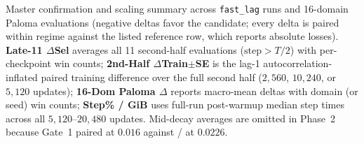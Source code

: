 \begin{table}[t]
\centering
\caption{Master confirmation and scaling summary across \confTotalRuns{}
\texttt{fast\_lag} runs and \confPalomaCount{} 16-domain Paloma evaluations
(negative deltas favor the candidate; every delta is paired within regime
against the listed  reference row, which reports absolute losses).
\textbf{Late-11 $\Delta$Sel} averages all 11 second-half evaluations
($\text{step} > T/2$) with per-checkpoint win counts; \textbf{2nd-Half
$\Delta$Train$\pm$SE} is the lag-1 autocorrelation-inflated paired training
difference over the full second half ($2{,}560$, $10{,}240$, or $5{,}120$
updates); \textbf{16-Dom Paloma $\Delta$} reports macro-mean deltas with domain
(or seed) win counts; \textbf{Step\% / GiB} uses full-run post-warmup median
step times across all $5{,}120$--$20{,}480$ updates. Mid-decay averages are
omitted in Phase~2 because Gate~1 paired  at $0.016$ against
/ at $0.0226$.}
\label{tab:confirmation}
\scriptsize\setlength{\tabcolsep}{3.1pt}
\resizebox{\textwidth}{!}{}
\end{table}

